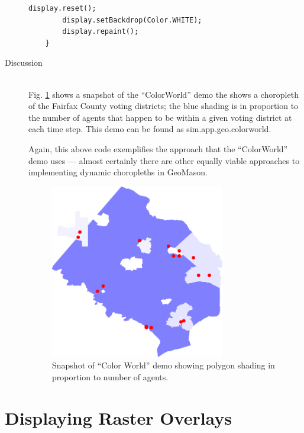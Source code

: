 \documentclass[twoside,10pt]{book}
\newcommand\file[1]{\textsf{#1}}
\newcommand\class[1]{\index{Classes!{#1}}\textsf{#1}}
\begin{document}
\begin{description}
\begin{Verbatim}[frame=lines,label=Set up portrayal in \class{GUIState},framesep=5mm,commandchars=+\[\]]
        display.reset();
        display.setBackdrop(Color.WHITE);
        display.repaint();
    }
\end{Verbatim}


\item[Discussion]~\\
Fig. \ref{fig:colorworld} shows a snapshot of the ``ColorWorld'' demo
the shows a choropleth of the Fairfax County voting districts; the
blue shading is in proportion to the number of agents that happen to
be within a given voting district at each time step.  This demo can be
found as \file{sim.app.geo.colorworld}.

Again, this above code exemplifies the approach that the ``ColorWorld'' demo uses ---
almost certainly there are other equally viable approaches to
implementing dynamic choropleths in GeoMason.

\begin{figure}[ht]
  \centering
  \includegraphics[width=0.75\textwidth]{ColorWorld.pdf}
  \caption{Snapshot of ``Color World'' demo showing polygon shading in
    proportion to number of agents.}
  \label{fig:colorworld}
\end{figure}

\end{description}



\section{Displaying Raster Overlays}
\label{sec:displayingrasteroverlays}
\end{document}

